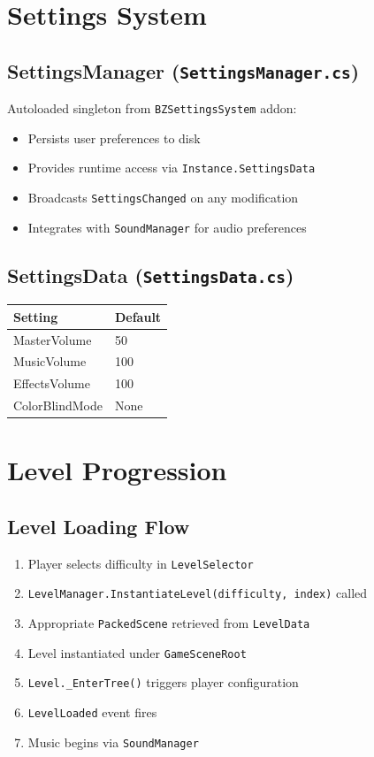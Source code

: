 \documentclass{report}
\begin{document}
\chapter{Settings System}
\section{SettingsManager (\texttt{SettingsManager.cs})}
Autoloaded singleton from \texttt{BZSettingsSystem} addon:

\begin{itemize}[noitemsep]
	\item Persists user preferences to disk
	\item Provides runtime access via \texttt{Instance.SettingsData}
	\item Broadcasts \texttt{SettingsChanged} on any modification
	\item Integrates with \texttt{SoundManager} for audio preferences
\end{itemize}

\section{SettingsData (\texttt{SettingsData.cs})}
\begin{longtable}{|l|l|}
	\hline
	\textbf{Setting} & \textbf{Default} \\
	\hline
	MasterVolume     & 50               \\
	\hline
	MusicVolume      & 100              \\
	\hline
	EffectsVolume    & 100              \\
	\hline
	ColorBlindMode   & None             \\
	\hline
\end{longtable}

\chapter{Level Progression}
\section{Level Loading Flow}
\begin{enumerate}
	\item Player selects difficulty in \texttt{LevelSelector}
	\item \texttt{LevelManager.InstantiateLevel(difficulty, index)} called
	\item Appropriate \texttt{PackedScene} retrieved from \texttt{LevelData}
	\item Level instantiated under \texttt{GameSceneRoot}
	\item \texttt{Level.\_EnterTree()} triggers player configuration
	\item \texttt{LevelLoaded} event fires
	\item Music begins via \texttt{SoundManager}
\end{enumerate}
\end{document}
